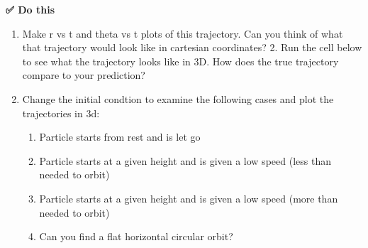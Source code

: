 \begin{Shaded}
\begin{Highlighting}[]

\OperatorTok{=}
    
\OperatorTok{=} 

\OperatorTok{=} 


\OperatorTok{=} 
\OperatorTok{=}  
\OperatorTok{=}

\OperatorTok{=} 
\OperatorTok{=} 
\OperatorTok{=}\NormalTok{ [}\NormalTok{,}\NormalTok{,}\NormalTok{,}\NormalTok{] }

\OperatorTok{=}\OperatorTok{=}\OperatorTok{=}\OperatorTok{=}\NormalTok{)}
\end{Highlighting}
\end{Shaded}

\textbf{✅ Do this}

\begin{enumerate}
\def\labelenumi{\arabic{enumi}.}
\item
  Make r vs t and theta vs t plots of this trajectory. Can you think of
  what that trajectory would look like in cartesian coordinates? 2. Run
  the cell below to see what the trajectory looks like in 3D. How does
  the true trajectory compare to your prediction?
\item
  Change the initial condtion to examine the following cases and plot
  the trajectories in 3d:

  \begin{enumerate}
  \def\labelenumii{\alph{enumii}.}
  \item
    Particle starts from rest and is let go
  \item
    Particle starts at a given height and is given a low speed (less
    than needed to orbit)
  \item
    Particle starts at a given height and is given a low speed (more
    than needed to orbit)
  \item
    Can you find a flat horizontal circular orbit?
  \end{enumerate}
\end{enumerate}

